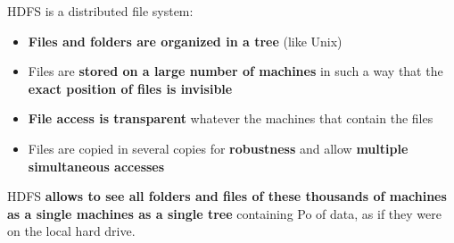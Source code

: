 \documentclass{beamer}[10pt, usepdftitle=false handout]
\begin{document}
	\begin{frame}
	
HDFS is a distributed file system:
\vspace*{0.6em}

\begin{itemize}
	\item{\textbf{Files and folders are organized in a tree} (like Unix)}
	\item{Files are \textbf{stored on a large number of machines} in such a way that the \textbf{exact position of files is invisible}}
	\item{\textbf{File access is transparent} whatever the machines that contain the files}
	\item{Files are copied in several copies for \textbf{robustness} and allow \textbf{multiple simultaneous accesses}}
\end{itemize}
\vspace*{0.6em}
	
HDFS \textbf{allows to see all folders and files of these thousands of machines as a single machines as a single tree} containing Po of data, as if they were on the local hard drive.	
		
	\end{frame}
	
\end{document}
